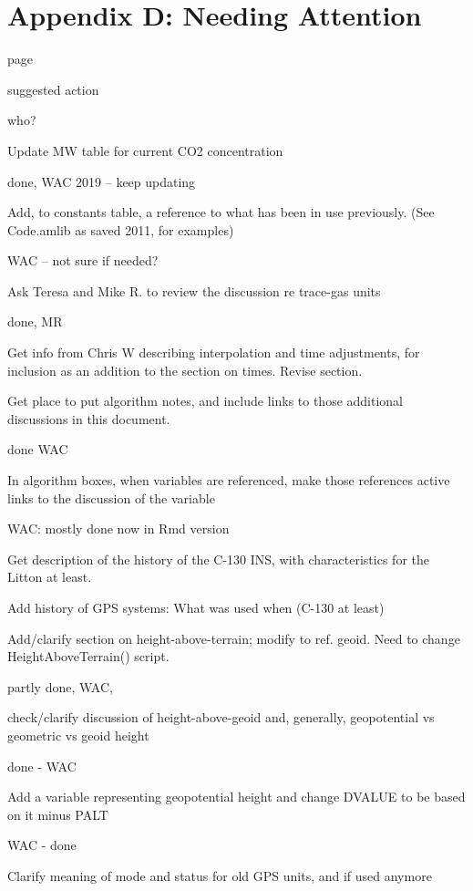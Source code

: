 \documentclass[
]{book}
\begin{document}
\hypertarget{appendix-d-needing-attention}{%
\chapter*{Appendix D: Needing Attention}\label{appendix-d-needing-attention}}

page

suggested action

who?

Update MW table for current CO2 concentration

done, WAC 2019 -- keep updating

Add, to constants table, a reference to what has been in use previously. (See Code.amlib as saved 2011, for examples)

WAC -- not sure if needed?

Ask Teresa and Mike R. to review the discussion re trace-gas units

done, MR

Get info from Chris W describing interpolation and time adjustments, for inclusion as an addition to the section on times. Revise section.

Get place to put algorithm notes, and include links to those additional discussions in this document.

done WAC

In algorithm boxes, when variables are referenced, make those references active links to the discussion of the variable

WAC: mostly done now in Rmd version

Get description of the history of the C-130 INS, with characteristics for the Litton at least.

Add history of GPS systems: What was used when (C-130 at least)

Add/clarify section on height-above-terrain; modify to ref. geoid. Need to change HeightAboveTerrain() script.

partly done, WAC,

check/clarify discussion of height-above-geoid and, generally, geopotential vs geometric vs geoid height

done - WAC

Add a variable representing geopotential height and change DVALUE to be based on it minus PALT

WAC - done

Clarify meaning of mode and status for old GPS units, and if used anymore
\end{document}

